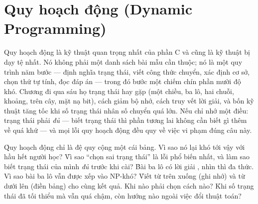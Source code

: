 \documentclass[../../algorithm.tex]{subfiles}
\begin{document}
\chapter{Quy hoạch động (Dynamic Programming)}

\begin{tomtat}
Quy hoạch động là kỹ thuật quan trọng nhất của phần C và cũng là kỹ thuật bị dạy tệ nhất. Nó không phải một danh sách bài mẫu cần thuộc; nó là một quy trình năm bước --- định nghĩa trạng thái, viết công thức chuyển, xác định cơ sở, chọn thứ tự tính, đọc đáp án --- trong đó bước một chiếm chín phần mười độ khó. Chương đi qua sáu họ trạng thái hay gặp (một chiều, ba lô, hai chuỗi, khoảng, trên cây, mặt nạ bit), cách giảm bộ nhớ, cách truy vết lời giải, và bốn kỹ thuật tăng tốc khi số trạng thái nhân số chuyển quá lớn. Nếu chỉ nhớ một điều: trạng thái phải \emph{đủ} --- biết trạng thái thì phần tương lai không cần biết gì thêm về quá khứ --- và mọi lỗi quy hoạch động đều quy về việc vi phạm đúng câu này.
\end{tomtat}

\begin{nentang}
\end{nentang}

\begin{khoigoi}
\h{Quy hoạch động chỉ là đệ quy cộng một cái bảng. Vì sao nó lại khó tới vậy với hầu hết người học?}
\h{Vì sao ``chọn sai trạng thái'' là lỗi phổ biến nhất, và làm sao biết trạng thái của mình \emph{đủ} trước khi cài?}
\h{Bài ba lô có lời giải , nhìn thì đa thức. Vì sao bài ba lô vẫn được xếp vào NP-khó?}
\h{Viết từ trên xuống (ghi nhớ) và từ dưới lên (điền bảng) cho cùng kết quả. Khi nào phải chọn cách nào?}
\h{Khi số trạng thái đã tối thiểu mà vẫn quá chậm, còn hướng nào ngoài việc đổi thuật toán?}
\end{khoigoi}
\end{document}
